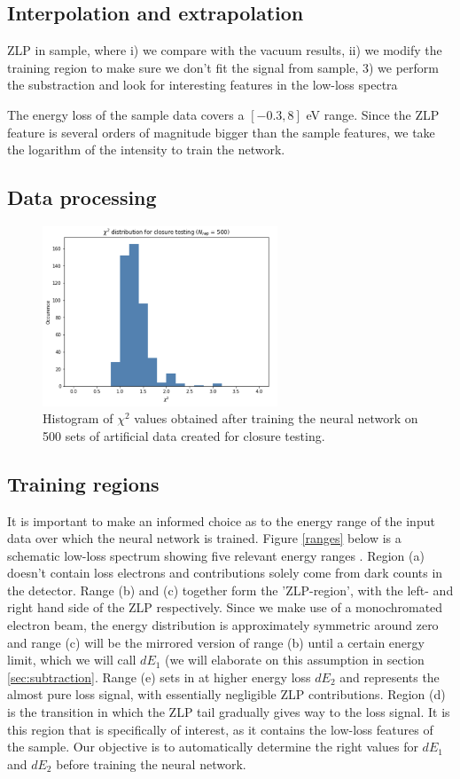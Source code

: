 \subsection{Interpolation and extrapolation}

ZLP in sample, where i) we compare with the vacuum results, ii) we modify the training region to make sure we don't fit the signal from sample, 3) we perform the substraction and look for interesting features in the low-loss spectra

The energy loss of the sample data covers a $[-0.3, 8]$ eV range. Since the ZLP feature is several orders of magnitude bigger than the sample features, we take the logarithm of the intensity to train the network. 
 
\subsection{Data processing}
\begin{figure}[H]
    \centering
    \includegraphics[width=70mm]{plots/closure.png}
    \caption{Histogram of $\chi^2$ values obtained after training the neural network on 500 sets of artificial data created for closure testing.}
    \label{closure2}
\end{figure}

\subsection{Training regions} \label{sec:regions}
It is important to make an informed choice as to the energy range of the input data over which the neural network is trained. Figure \ref{ranges} below is a schematic low-loss spectrum showing five relevant energy ranges \cite{Reed:2002}. Region (a) doesn't contain loss electrons and contributions solely come from dark counts in the detector. Range (b) and (c) together form the 'ZLP-region', with the left- and right hand side of the ZLP respectively. Since we make use of a monochromated electron beam, the energy distribution is approximately symmetric around zero and range (c) will be the mirrored version of range (b) until a certain energy limit, which we will call $dE_1$ (we will elaborate on this assumption in section \ref{sec:subtraction}. Range (e) sets in at higher energy loss $dE_2$ and represents the almost pure loss signal, with essentially negligible ZLP contributions. Region (d) is the transition in which the ZLP tail gradually gives way to the loss signal. It is this region that is specifically of interest, as it contains the low-loss features of the sample.  Our objective is to automatically determine the right values for $dE_1$ and $dE_2$ before training the neural network.

